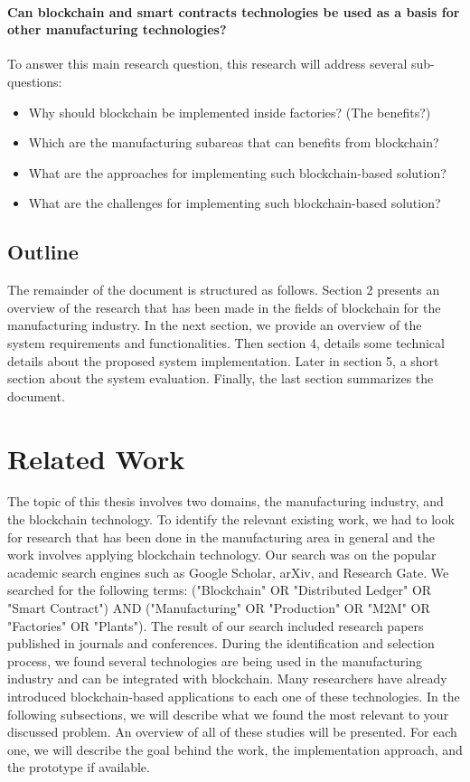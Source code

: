 \documentclass[runningheads]{llncs}
\begin{document}
\paragraph{Can blockchain and smart contracts technologies be used as a basis for other manufacturing technologies?} To answer this main research question, this research will address several sub-questions:
\begin{itemize}
  \item Why should blockchain be implemented inside factories? (The benefits?)
  \item Which are the manufacturing subareas that can benefits from blockchain?
  \item What are the approaches for implementing such blockchain-based solution? 
  \item What are the challenges for implementing such blockchain-based solution? 
\end{itemize}

\subsection{Outline}
The remainder of the document is structured as follows. Section 2 presents an overview of the research that has been made in the fields of blockchain for the manufacturing industry. In the next section, we provide an overview of the system requirements and functionalities. Then section 4, details some technical details about the proposed system implementation. Later in section 5, a short section about the system evaluation. Finally, the last section summarizes the document. 

\newpage

\section{Related Work}
The topic of this thesis involves two domains, the manufacturing industry, and the blockchain technology. To identify the relevant existing work, we had to look for research that has been done in the manufacturing area in general and the work involves applying blockchain technology. Our search was on the popular academic search engines such as Google Scholar, arXiv, and Research Gate. We searched for the following terms: ("Blockchain" OR "Distributed Ledger" OR "Smart Contract") AND ("Manufacturing" OR "Production" OR "M2M" OR "Factories" OR "Plants").  The result of our search included research papers published in journals and conferences. During the identification and selection process, we found several technologies are being used in the manufacturing industry and can be integrated with blockchain. Many researchers have already introduced blockchain-based applications to each one of these technologies. In the following subsections, we will describe what we found the most relevant to your discussed problem. An overview of all of these studies will be presented. For each one, we will describe the goal behind the work, the implementation approach, and the prototype if available. 
\end{document}
